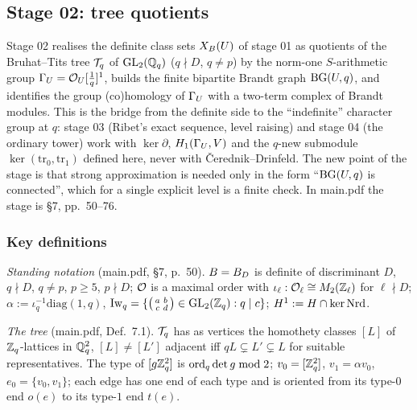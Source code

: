 \subsection{Stage 02: tree quotients}\label{ss:stage02}

Stage 02 realises the definite class sets $X_B(U)$ of stage 01 as quotients of the Bruhat--Tits tree $\mathcal{T}_q$ of
$\mathrm{GL}_2(\mathbb{Q}_q)$ ($q\nmid D$, $q\ne p$) by the norm-one $S$-arithmetic group $\Gamma_U=\mathcal{O}_U[\tfrac1q]^1$, builds the finite
bipartite Brandt graph $\mathrm{BG}(U,q)$, and identifies the group (co)homology of $\Gamma_U$ with a two-term complex of Brandt
modules. This is the bridge from the definite side to the ``indefinite'' character group at $q$: stage 03 (Ribet's exact
sequence, level raising) and stage 04 (the ordinary tower) work with $\ker\partial$, $H_1(\Gamma_U,V)$ and the $q$-new
submodule $\ker(\mathrm{tr}_0,\mathrm{tr}_1)$ defined here, never with \v{C}erednik--Drinfeld. The new point of the stage is
that strong approximation is needed only in the form ``$\mathrm{BG}(U,q)$ is connected'', which for a single explicit level is a
finite check. In main.pdf the stage is \S7, pp.~50--76.

\subsubsection*{Key definitions}
\emph{Standing notation} (main.pdf, \S7, p.~50). $B=B_D$ is definite of discriminant $D$, $q\nmid D$, $q\ne p$, $p\ge5$,
$p\nmid D$; $\mathcal{O}$ is a maximal order with $\iota_\ell:\mathcal{O}_\ell\cong M_2(\mathbb{Z}_\ell)$ for $\ell\nmid D$; $\alpha:=\iota_q^{-1}\mathrm{diag}(1,q)$,
$\mathrm{Iw}_q=\{\left(\begin{smallmatrix}a&b\\c&d\end{smallmatrix}\right)\in\mathrm{GL}_2(\mathbb{Z}_q):q\mid c\}$; $H^1:=H\cap\ker\mathrm{Nrd}$.

\emph{The tree} (main.pdf, Def.~7.1). $\mathcal{T}_q$ has as vertices the homothety classes $[L]$ of $\mathbb{Z}_q$-lattices in $\mathbb{Q}_q^2$,
$[L]\ne[L']$ adjacent iff $qL\subsetneq L'\subsetneq L$ for suitable representatives. The type of $[g\mathbb{Z}_q^2]$ is
$\mathrm{ord}_q\det g\bmod 2$; $v_0=[\mathbb{Z}_q^2]$, $v_1=\alpha v_0$, $e_0=\{v_0,v_1\}$; each edge has one end of each type and is oriented
from its type-$0$ end $o(e)$ to its type-$1$ end $t(e)$.

